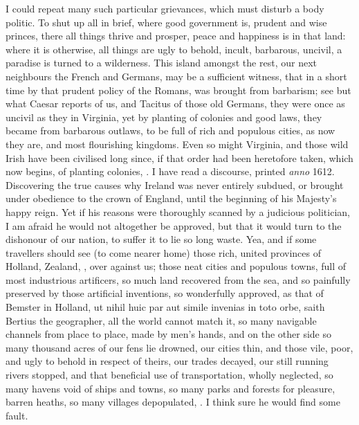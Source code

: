 {I could repeat many such particular grievances, which must disturb a
body politic. To shut up all in brief, where good government is,
prudent and wise princes, there all things thrive and prosper, peace
and happiness is in that land: where it is otherwise, all things are
ugly to behold, incult, barbarous, uncivil, a paradise is turned to a
wilderness. This island amongst the rest, our next neighbours the
French and Germans, may be a sufficient witness, that in a short time
by that prudent policy of the Romans, was brought from barbarism; see
but what Caesar reports of us, and Tacitus of those old Germans, they
were once as uncivil as they in Virginia, yet by planting of colonies
and good laws, they became from barbarous outlaws, to be full of
rich and populous cities, as now they are, and most flourishing
kingdoms. Even so might Virginia, and those wild Irish have been
civilised long since, if that order had been heretofore taken, which
now begins, of planting colonies, \etc{}. I have read a discourse,
printed \emph{anno} 1612. Discovering the true causes why Ireland was never
entirely subdued, or brought under obedience to the crown of England,
until the beginning of his Majesty's happy reign. Yet if his reasons
were thoroughly scanned by a judicious politician, I am afraid he would
not altogether be approved, but that it would turn to the dishonour of
our nation, to suffer it to lie so long waste. Yea, and if some
travellers should see (to come nearer home) those rich, united
provinces of Holland, Zealand, \etc{}, over against us; those neat cities
and populous towns, full of most industrious artificers, so much
land recovered from the sea, and so painfully preserved by those
artificial inventions, so wonderfully approved, as that of Bemster in
Holland, ut nihil huic par aut simile invenias in toto orbe, saith
Bertius the geographer, all the world cannot match it, so many
navigable channels from place to place, made by men's hands, \etc{} and on
the other side so many thousand acres of our fens lie drowned, our
cities thin, and those vile, poor, and ugly to behold in respect of
theirs, our trades decayed, our still running rivers stopped, and that
beneficial use of transportation, wholly neglected, so many havens void
of ships and towns, so many parks and forests for pleasure, barren
heaths, so many villages depopulated, \etc{}. I think sure he would find
some fault.

}
